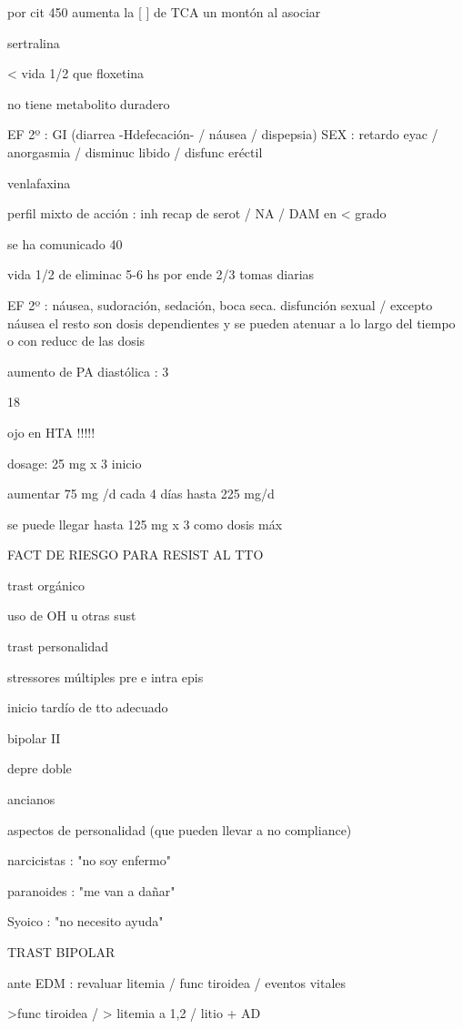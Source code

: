 por cit 450 aumenta la [ ] de TCA un montón al asociar

sertralina

< vida 1/2 que floxetina

no tiene metabolito duradero

EF 2º : GI (diarrea -Hdefecación- / náusea / dispepsia) SEX : retardo eyac / anorgasmia / disminuc libido / disfunc eréctil

venlafaxina

perfil mixto de acción : inh recap de serot / NA / DAM en < grado

se ha comunicado 40 %

vida 1/2 de eliminac 5-6 hs por ende 2/3 tomas diarias

EF 2º : náusea, sudoración, sedación, boca seca. disfunción sexual / excepto náusea el resto son dosis dependientes y se pueden atenuar a lo largo del tiempo o con reducc de las dosis

aumento de PA diastólica : 3%

18 %

ojo en HTA !!!!!

dosage: 25 mg x 3 inicio

aumentar 75 mg /d cada 4 días hasta 225 mg/d

se puede llegar hasta 125 mg x 3 como dosis máx

FACT DE RIESGO PARA RESIST AL TTO

trast orgánico

uso de OH u otras sust

trast personalidad

stressores múltiples pre e intra epis

inicio tardío de tto adecuado

bipolar II

depre doble

ancianos

aspectos de personalidad (que pueden llevar a no compliance)

narcicistas : "no soy enfermo"

paranoides : "me van a dañar"

Syoico : "no necesito ayuda"

TRAST BIPOLAR

ante EDM : revaluar litemia / func tiroidea / eventos vitales

>func tiroidea / > litemia a 1,2 / litio + AD

